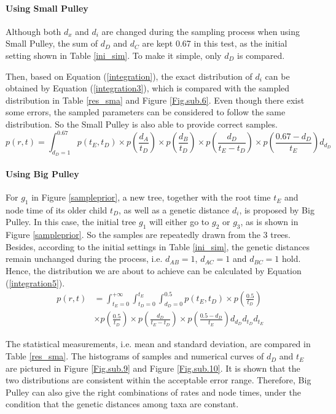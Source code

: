 \documentclass{bmcart}
\begin{document}
\begin{backmatter}
\paragraph*{Using Small Pulley}

Although both ${d_x}$ and ${d_i}$ are changed during the sampling process when using Small Pulley, the sum of ${d_D}$ and ${d_C}$ are kept 0.67 in this test, as the initial setting shown in Table \ref{ini_sim}. To make it simple, only ${d_D}$ is compared.

Then, based on Equation (\ref{integration}), the exact distribution of ${d_i}$ can be obtained by Equation (\ref{integration3}), which is compared with the sampled distribution in Table \ref{res_sma} and Figure \ref{Fig.sub.6}. Even though there exist some errors, the sampled parameters can be considered to follow the same distribution. So the Small Pulley is also able to provide correct samples.
\begin{equation}\label{integration3}
p(r,t) = \int_{{d_D} = 1}^{0.67} {p({t_E},{t_D}) \times p(\frac{{{d_A}}}{{{t_D}}}) \times p(\frac{{{d_B}}}{{{t_D}}}) \times p(\frac{{{d_D}}}{{{t_E} - {t_D}}}) \times p(\frac{{0.67 - {d_D}}}{{{t_E}}}){d_{d_D}}}
\end{equation}

\paragraph*{Using Big Pulley}

For $g_1$ in Figure \ref{sampleprior}, a new tree, together with the root time $t_E$ and node time of its older child $t_D$, as well as a genetic distance $d_i$, is proposed by Big Pulley. In this case, the initial tree $g_1$ will either go to $g_2$ or $g_3$, as is shown in Figure \ref{sampleprior}.  So the samples are repeatedly drawn from the 3 trees. Besides, according to the initial settings in Table \ref{ini_sim}, the genetic distances remain unchanged during the process, i.e. $d_{AB} = 1$, $d_{AC}  = 1$ and $d_{BC} = 1$ hold. Hence, the distribution we are about to achieve can be calculated by Equation (\ref{integration5}).
\begin{equation}\label{integration5}
\begin{aligned}
p(r,t) &= \int_{{t_E} = 0}^{ + \infty } {\int_{{t_D} = 0}^{{t_E}} {\int_{{d_D} = 0}^{0.5} {p({t_E},{t_D})} } \times p(\frac{{0.5}}{{{t_D}}})}  \\&\times p(\frac{{0.5}}{{{t_D}}}) \times p(\frac{{{d_D}}}{{{t_E} - {t_D}}}) \times p(\frac{{0.5 - {d_D}}}{{{t_E}}}){d_{d_D}}{d_{t_D}}{d_{t_E}}
\end{aligned}
\end{equation}

The statistical measurements, i.e. mean and standard deviation, are compared in Table \ref{res_sma}. The histograms of samples and numerical curves of ${d_D}$ and ${t_E}$ are pictured in Figure \ref{Fig.sub.9} and Figure \ref{Fig.sub.10}. It is shown that the two distributions are consistent within the acceptable error range. Therefore, Big Pulley can also give the right combinations of rates and node times, under the condition that the genetic distances among taxa are constant.

\end{backmatter}
\end{document}
